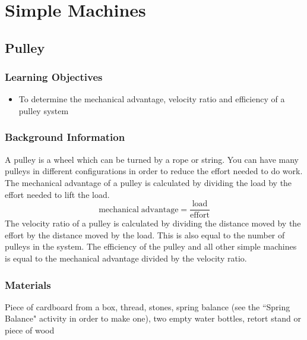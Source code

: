 \section{Simple Machines}





\subsection{Pulley}

\subsubsection*{Learning Objectives}
\begin{itemize}
\item{To determine the mechanical advantage, velocity ratio and efficiency of a pulley system}
\end{itemize}

\subsubsection*{Background Information}
A pulley is a wheel which can be turned by a rope or string.  You can have many pulleys in different configurations in order to reduce the effort needed to do work.
The mechanical advantage of a pulley is calculated by dividing the load by the effort needed to lift the load.
$$\mathrm{mechanical \;advantage} = \frac{\mathrm{load}}{\mathrm{effort}}$$
The velocity ratio of a pulley is calculated by dividing the distance moved by the effort by the distance moved by the load.  This is also equal to the number of pulleys in the system.
The efficiency of the pulley and all other simple machines is equal to the mechanical advantage divided by the velocity ratio.

\subsubsection*{Materials}
Piece of cardboard from a box, thread, stones, spring balance (see the ``Spring Balance" activity in order to make one), two empty water bottles, retort stand or piece of wood

